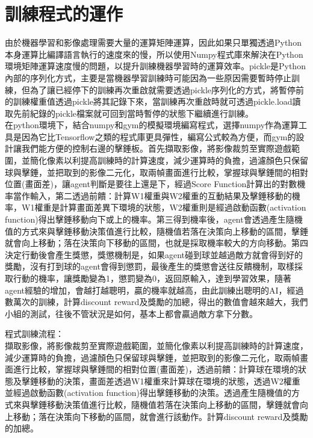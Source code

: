 \documentclass[14pt,a4paper]{report}  %
\begin{document}
\section{訓練程式的運作}
 由於機器學習和影像處理需要大量的運算矩陣運算，因此如果只單獨透過Python本身運算比編譯語言執行的速度來的慢，所以使用Numpy程式庫來解決在Python環境矩陣運算速度慢的問題，以提升訓練機器學習時的運算效率。pickle是Python內部的序列化方式，主要是當機器學習訓練時可能因為一些原因需要暫時停止訓練，但為了讓已經停下的訓練再次重啟就需要透過pickle序列化的方式，將暫停前的訓練權重值透過pickle將其記錄下來，當訓練再次重啟時就可透過pickle.load讀取先前紀錄的pickle檔案就可回到當時暫停的狀態下繼續進行訓練。\\
 
 在python環境下，結合numpy和gym的模擬環境編寫程式，選擇numpy作為運算工具是因為它比Tensorflow之類的程式庫更具彈性，編寫公式較為方便，而gym的設計讓我們能方便的控制右邊的擊錘板。首先擷取影像，將影像裁剪至實際遊戲範圍，並簡化像素以利提高訓練時的計算速度，減少運算時的負擔，過濾顏色只保留球與擊錘，並把取到的影像二元化，取兩幀畫面進行比較，掌握球與擊錘間的相對位置(畫面差)，讓agent判斷是要往上還是下，經過Score Function計算出的對數機率當作輸入，第二透過前饋：計算W1權重與W2權重的互動結果及擊錘移動的機率，W1權重是計算畫面差異下環境的狀態，W2權重則是經過啟動函數(activation function)得出擊錘移動向下或上的機率。第三得到機率後，agent會透過產生隨機值的方式來與擊錘移動決策值進行比較，隨機值若落在決策向上移動的區間，擊錘就會向上移動；落在決策向下移動的區間，也就是採取機率較大的方向移動。第四決定行動後會產生獎懲，獎懲機制是，如果agent碰到球並越過敵方就會得到好的獎勵，沒有打到球的agent會得到懲罰，最後產生的獎懲會送往反饋機制，取樣採取行動的機率，讓獎勵變為1，懲罰變為0，返回原輸入，達到學習效果，隨著agent經驗的增加，會越打越聰明，贏的機率就越高，由此訓練出聰明的AI，經過數萬次的訓練，計算discount reward及獎勵的加總，得出的數值會越來越大，我們小組的測試，往後不管狀況是如何，基本上都會贏過敵方拿下分數。

程式訓練流程：\\
 擷取影像，將影像裁剪至實際遊戲範圍，並簡化像素以利提高訓練時的計算速度，減少運算時的負擔，過濾顏色只保留球與擊錘，並把取到的影像二元化，取兩幀畫面進行比較，掌握球與擊錘間的相對位置(畫面差)，透過前饋：計算球在環境的狀態及擊錘移動的決策，畫面差透過W1權重來計算球在環境的狀態，透過W2權重並經過啟動函數(activation function)得出擊錘移動的決策。透過產生隨機值的方式來與擊錘移動決策值進行比較，隨機值若落在決策向上移動的區間，擊錘就會向上移動；落在決策向下移動的區間，就會進行該動作。計算discount reward及獎勵的加總。\\
\end{document}

